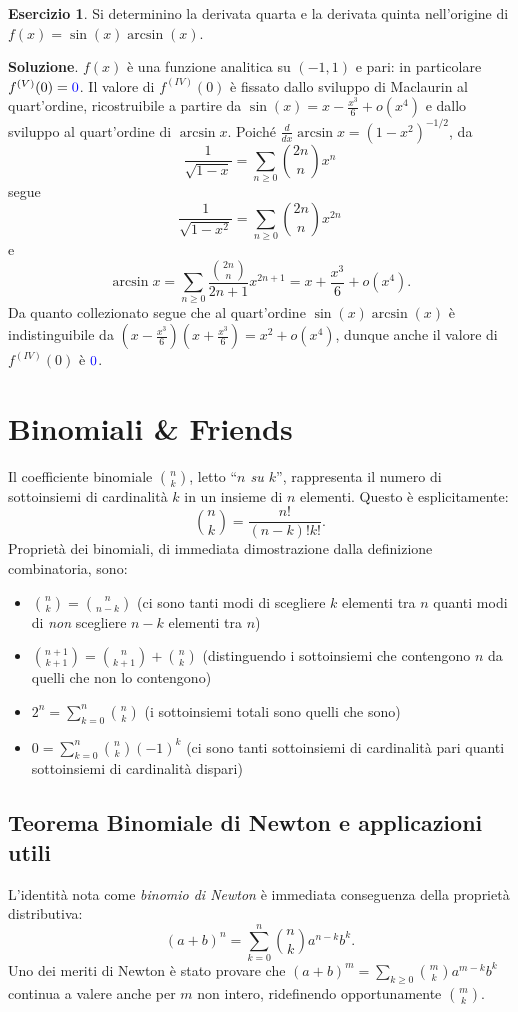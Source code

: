 \documentclass[a4paper,twoside]{article}
\theoremstyle{definition}
\newtheorem{ex}[theorem]{Esercizio}
\numberwithin{theorem}{section}
\begin{document}
\begin{ex} Si determinino la derivata quarta e la derivata quinta nell'origine di $f(x)=\sin(x)\arcsin(x)$. 
\end{ex}
\textbf{Soluzione}. $f(x)$ è una funzione analitica su $(-1,1)$ e pari: in particolare $f^{(V)}(0)={\color{blue}0}$. Il valore di $f^{(IV)}(0)$ è fissato dallo sviluppo di Maclaurin al quart'ordine, ricostruibile a partire da $\sin(x)=x-\frac{x^3}{6}+o(x^4)$ e dallo sviluppo al quart'ordine di $\arcsin x$. Poiché $\frac{d}{dx}\arcsin x = (1-x^2)^{-1/2}$, da 
$$ \frac{1}{\sqrt{1-x}} = \sum_{n\geq 0}\binom{2n}{n}x^n $$
segue 
$$ \frac{1}{\sqrt{1-x^2}}= \sum_{n\geq 0}\binom{2n}{n} x^{2n} $$
e 
$$ \arcsin x = \sum_{n\geq 0}\frac{\binom{2n}{n}}{2n+1}x^{2n+1} = x + \frac{x^3}{6} + o(x^4).$$
Da quanto collezionato segue che al quart'ordine $\sin(x)\arcsin(x)$ è indistinguibile da $\left(x-\frac{x^3}{6}\right)\left(x+\frac{x^3}{6}\right)=x^2+o(x^4)$, dunque anche il valore di $f^{(IV)}(0)$ è $\color{blue}0$.

\newpage

\section{Binomiali \& Friends}
Il coefficiente binomiale $\binom{n}{k}$, letto ``\emph{$n$ su $k$}'', rappresenta il numero di sottoinsiemi di cardinalità $k$ in un insieme di $n$ elementi.
Questo è esplicitamente:\\
$$\binom{n}{k} = \frac{n!}{(n-k)!k!}.$$
Proprietà dei binomiali, di immediata dimostrazione dalla definizione combinatoria, sono:
\begin{itemize}
    \item $\binom{n}{k}=\binom{n}{n-k}$ (ci sono tanti modi di scegliere $k$ elementi tra $n$ quanti modi di \emph{non} scegliere $n-k$ elementi tra $n$)
    \item $\binom{n+1}{k+1}=\binom{n}{k+1} + \binom{n}{k}$ (distinguendo i sottoinsiemi che contengono $n$ da quelli che non lo contengono)
    \item $2^n= \sum_{k=0}^{n}\binom{n}{k}$ (i sottoinsiemi totali sono quelli che sono)
    \item $0 = \sum_{k=0}^{n}\binom{n}{k}(-1)^k$ (ci sono tanti sottoinsiemi di cardinalità pari quanti sottoinsiemi di cardinalità dispari)
\end{itemize}

\subsection{Teorema Binomiale di Newton e applicazioni utili}
L'identità nota come \emph{binomio di Newton} è immediata conseguenza della proprietà distributiva:
$$(a+b)^n=\sum_{k=0}^{n}\binom{n}{k}a^{n-k}b^k.$$
Uno dei meriti di Newton è stato provare che $(a+b)^m=\sum_{k\geq 0}\binom{m}{k}a^{m-k}b^k$ continua a valere anche per $m$ non intero, ridefinendo opportunamente $\binom{m}{k}$.
\end{document}
